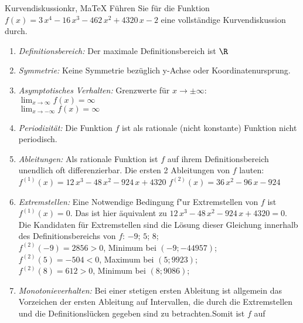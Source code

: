  \providecommand{\MoIl}{(} 
 \providecommand{\MoIr}{)}
 \providecommand{\MIntvlSep}{;} 
 \providecommand{\MElSetSep}{;} 
 \begin{MAufgabe}{Kurvendiskussion}{kr, MaTeX}
 F\"uhren Sie f\"ur die Funktion $f(x)=3\, x^4 - 16\, x^3 - 462\, x^2 + 4320\, x - 2$ eine vollst\"andige Kurvendiskussion durch.\\ 
 \ifLsg\Loesung
 \begin{enumerate}
 \item \emph{Definitionsbereich:} 
 Der maximale Definitionsbereich ist $\R$\item \emph{Symmetrie:} 
 Keine Symmetrie bez\"uglich y-Achse oder Koordinatenursprung.\item \emph{Asymptotisches Verhalten:} 
 Grenzwerte f\"ur $x\rightarrow \pm \infty$: \\ 
 $\lim_{x\rightarrow \infty} f(x)=\infty$ \\ 
 $\lim_{x\rightarrow -\infty} f(x)=\infty$ \\ 
 \item \emph{Periodizit\"at:} 
 Die Funktion $f$ ist als rationale (nicht konstante) Funktion nicht periodisch.\item \emph{Ableitungen:} 
 Als rationale Funktion ist $f$ auf ihrem Definitionsbereich unendlich oft differenzierbar. 
 Die ersten 2 Ableitungen von $f$ lauten: \\ 
 $f^{(1)}(x)=12\, x^3 - 48\, x^2 - 924\, x + 4320$\newline 
  $f^{(2)}(x)=36\, x^2 - 96\, x - 924$\newline 
  \item \emph{Extremstellen:} 
 Eine Notwendige Bedingung f"ur Extremstellen von $f$ ist $f^{(1)}(x)=0$. 
 Das ist hier \"aquivalent zu $12\, x^3 - 48\, x^2 - 924\, x + 4320=0$. 
 Die Kandidaten f\"ur Extremstellen sind die L\"osung dieser Gleichung innerhalb des Definitionsbereichs von $f$: $-9$; $5$; $8$; \\ 
 $f^{(2)}(-9)=2856$$>0$, Minimum bei $(-9;-44957)$; \\ 
 $f^{(2)}(5)=-504$$<0$, Maximum bei $(5;9923)$; \\ 
 $f^{(2)}(8)=612$$>0$, Minimum bei $(8;9086)$; \\ 
 \item \emph{Monotonieverhalten:} 
 Bei einer stetigen ersten Ableitung ist allgemein das Vorzeichen der ersten Ableitung auf Intervallen, die durch die Extremstellen und die Definitionsl\"ucken gegeben sind zu betrachten.Somit ist $f$ auf \\ 
$$
\end{enumerate}
\end{MAufgabe}
